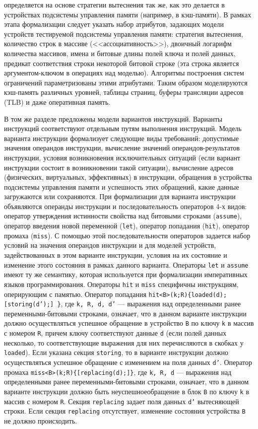 \documentclass[14pt,autoref,href
,facsimile
]{disser}
\begin{document}
определяется на основе стратегии вытеснения так же, как это делается в устройствах подсистемы управления памяти (например, в кэш-памяти). В рамках этапа формализации следует указать набор атрибутов, задающих модели устройств тестируемой подсистемы управления памяти: стратегия вытеснения, количество строк в массиве (<<ассоциативность>>), двоичный логарифм количества массивов, имена и битовые длины полей ключа и полей данных, предикат соответствия строки некоторой битовой строке (эта строка является аргументом-ключом в операциях над моделью). Алгоритмы построения систем ограничений параметризованы этими атрибутами. Таким образом моделируются кэш-память различных уровней, таблицы страниц, буферы трансляции адресов (TLB) и даже оперативная память.

В том же разделе предложены модели вариантов инструкций. Варианты инструкций соответствуют отдельным путям выполнения инструкций. Модель варианта инструкции формализует следующие виды требований: допустимые значения операндов инструкции, вычисление значений операндов-результатов инструкции, условия возникновения исключительных ситуаций (если вариант инструкции состоит в возникновении такой ситуации), вычисление адресов (физических, виртуальных, эффективных) в инструкции, обращения в устройства подсистемы управления памяти и успешность этих обращений, какие данные загружаются или сохраняются. При формализации для варианта инструкции объявляются операнды инструкции и последовательность операторов 4-х видов: оператор утверждения истинности свойства над битовыми строками (\texttt{assume}), оператор введения новой переменной (\texttt{let}), оператор попадания (\texttt{hit}), оператор промаха (\texttt{miss}). С помощью этой последовательности операторов задается набор условий на значения операндов инструкции и для моделей устройств, задействованных в этом варианте инструкции, условия на их состояние и изменение этого состояния в рамках данного варианта. Операторы \texttt{let} и \texttt{assume} имеют ту же семантику, которая используется при формализации императивных языков программирования. Операторы \texttt{hit} и \texttt{miss} специфичны инструкциям, оперирующим с памятью. Оператор попадания \texttt{hit<B>(k;R)\{loaded(d); [storing(d');] \}}, где \texttt{k, R, d, d'} --- выражения над определенными ранее переменными-битовыми строками, означает, что в данном варианте инструкции должно осуществляться успешное обращение в устройство \texttt{B} по ключу \texttt{k} в массив с номером \texttt{R}, причем ключу соответствуют данные \texttt{d} (если полей данных несколько, то соответствующие выражения для них перечисляются в скобках у \texttt{loaded}). Если указана секция \texttt{storing}, то в варианте инструкции должно осуществляться успешное обращение с изменением на поля данных \texttt{d'}. Оператор промаха \texttt{miss<B>(k;R)\{[replacing(d);]\}}, где \texttt{k, R, d} --- выражения над определенными ранее переменными-битовыми строками, означает, что в данном варианте инструкции должно быть неуспешноеобращение в блок \texttt{B} по ключу \texttt{k} в массив с номером \texttt{R}. Секция \texttt{replacing} задает поля данных \texttt{d'} вытесняющей строки. Если секция \texttt{replacing} отсутствует, изменение состояния устройства \texttt{B} не должно происходить.
\end{document}
